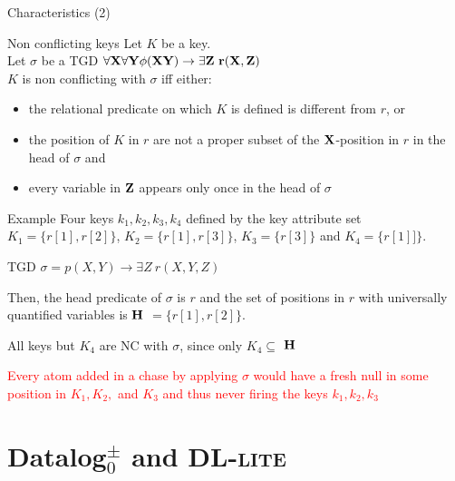 \documentclass{beamer}
\def\dl{\hbox{\textsc{DL-lite}}\xspace}
\begin{document}
 
 \begin{frame} {Characteristics (2)}
 
 \begin{block}{Non conflicting keys}
 Let $K$ be a key.\\
 Let $\sigma$ be a TGD $\forall \bf{X} \forall \bf{Y}  \phi (\bf{X} \bf{Y}) \rightarrow  \exists \bf{Z} ~r(\bf{X}, \bf{Z})$\\
 $K$ is non conflicting with $\sigma$ iff either:
 \begin{itemize}
 \item the relational  predicate on which $K$ is defined is different from $r$, or
 \item the position of $K$ in $r$ are not a proper subset of the $\bf{X}$-position in $r$ in the head of $\sigma$ and
 \item  every variable in $\bf{Z }$ appears only once in the head of $\sigma$
 \end{itemize}
 \end{block}
 
 \begin{block}{Example}
 \tiny
 Four keys $k_1, k_2, k_3, k_4$  defined by the key attribute set 
 $K_1 = \{r[1], r[2]\}$, 
 $K_2 = \{r[1], r[3]\}$,
 $K_3 = \{r[3]\}$ and
 $K_4 = \{r[1]]\}$.
 
 TGD $\sigma = p(X,Y) \rightarrow \exists Z  ~r(X, Y, Z)$
 
 Then, the head predicate of $\sigma$ is $r$ and the set of positions in $r$  with universally quantified variables is $\bf{H}$ $= \{r[1], r[2]\}$.
 
 All keys but $K_4$ are NC with $\sigma$, since only $K_4 \subseteq $ $\bf{H}$
 
 \textcolor{red}{Every atom added in a chase by applying $\sigma$ would have a fresh null in some position in $K_1, K_2,$ and $ K_3$ and thus never firing the keys $k_1, k_2, k_3$}
 
 
 \end{block}
 
 \end{frame}
 
 \section{Datalog$^\pm_0$ and \dl}
 
\end{document}
